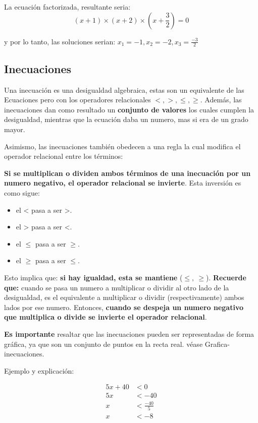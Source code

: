     La ecuación factorizada, resultante seria:
    $$ (x+1)\times(x+2)\times\left(x+\frac{3}{2}\right)= 0  $$

    y por lo tanto, las soluciones serian: $x_1 = -1, x_2 = -2, x_3=\frac{-3}{2} $

\subsection{Inecuaciones}

    Una inecuación es una desigualdad algebraica, estas son un equivalente de las
    \refname{Ecuaciones} pero con los operadores relacionales $<,>,\leq,\geq$.
    Además, las inecuaciones dan como resultado un \textbf{conjunto de valores}
    los cuales cumplen la desigualdad, mientras que la ecuación daba un numero,
    mas si era de un grado mayor.

    Asimismo, las inecuaciones también obedecen a una regla la cual modifica el
    operador relacional entre los términos:

    \textbf{Si se multiplican o dividen ambos términos de una inecuación por un
    numero negativo, el operador relacional se invierte}. Esta inversión es como
    sigue:

    \begin{itemize}
        \item el < pasa a ser >.
        \item el > pasa a ser <.
        \item el $\leq$ pasa a ser $\geq$.
        \item el $\geq$ pasa a ser $\leq$.
    \end{itemize}

    Esto implica que: \textbf{si hay igualdad, esta se mantiene} ($\leq,\ \geq$).
    \textbf{Recuerde que:} cuando se pasa un numero a multiplicar o dividir al
    otro lado de la desigualdad, es
    el equivalente a multiplicar o dividir (respectivamente) ambos lados por ese
    numero. Entonces, \textbf{cuando se despeja un numero negativo que multiplica
    o divide se invierte el operador relacional}.

    \textbf{Es importante} resaltar que las inecuaciones pueden ser representadas
    de forma gráfica, ya que son un conjunto de puntos en la recta real. véase
    \refname{Grafica-inecuaciones}.


    Ejemplo y explicación:

    \begin{align*}
        5x + 40 & < 0\\
        5x  & < -40\\
        x & < \frac{-40}{5} \\
        x & < -8 \\
    \end{align*}

